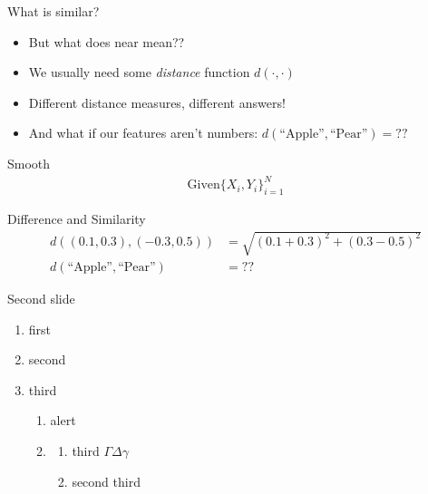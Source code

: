 \documentclass[lualatex, aspectratio=169]{beamer}
\begin{document}
\begin{frame}{What is similar?}
  \begin{itemize}
    \item But what does \alert{near} mean??
    \item We usually need some \emph{distance} function $d(\cdot, \cdot)$
    \item Different distance measures, different answers!
    \item And what if our features aren't numbers: $d(\textrm{``Apple''}, \textrm{``Pear''}) = ??$
  \end{itemize}
\end{frame}

\begin{frame}{Smooth}
  \begin{align*}
    \textrm{Given} \{X_i, Y_i\}_{i=1}^N 
  \end{align*}
\end{frame}


\begin{frame}{Difference and Similarity}
  \begin{align*}
    d((0.1, 0.3), (-0.3, 0.5)) &= \sqrt{(0.1 + 0.3)^2 + (0.3 - 0.5)^2} \\
    d(\textrm{``Apple''}, \textrm{``Pear''}) &= ??
  \end{align*}
\end{frame}

\begin{frame}{Second slide}
  \begin{enumerate}
    \item first
    \item second
    \item third
    \begin{enumerate}
      \item \alert{alert} 
      \item {}
			\begin{enumerate}
				\item third $\Gamma\Delta\gamma$
				\item second third
			\end{enumerate}
    \end{enumerate}
  \end{enumerate}
\end{frame}
\end{document}
